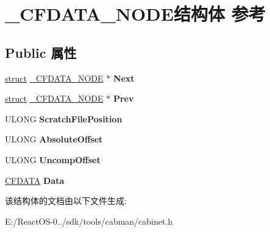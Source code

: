 \hypertarget{struct___c_f_d_a_t_a___n_o_d_e}{}\section{\+\_\+\+C\+F\+D\+A\+T\+A\+\_\+\+N\+O\+D\+E结构体 参考}
\label{struct___c_f_d_a_t_a___n_o_d_e}
\subsection*{Public 属性}
\begin{DoxyCompactItemize}
\item 
\mbox{\label{struct___c_f_d_a_t_a___n_o_d_e_a4a7a9c1c5ee08ed26302dc3ba5686542}} 
\hyperlink{interfacestruct}{struct} \hyperlink{struct___c_f_d_a_t_a___n_o_d_e}{\+\_\+\+C\+F\+D\+A\+T\+A\+\_\+\+N\+O\+DE} $\ast$ {\bfseries Next}
\item 
\mbox{\label{struct___c_f_d_a_t_a___n_o_d_e_a092d5560835be2e37dc0b11e6d3bfea1}} 
\hyperlink{interfacestruct}{struct} \hyperlink{struct___c_f_d_a_t_a___n_o_d_e}{\+\_\+\+C\+F\+D\+A\+T\+A\+\_\+\+N\+O\+DE} $\ast$ {\bfseries Prev}
\item 
\mbox{\label{struct___c_f_d_a_t_a___n_o_d_e_aec20aea2f5178a56855bcb5107ea31a3}} 
U\+L\+O\+NG {\bfseries Scratch\+File\+Position}
\item 
\mbox{\label{struct___c_f_d_a_t_a___n_o_d_e_a7e2057fb933826e0389485e581dc26b5}} 
U\+L\+O\+NG {\bfseries Absolute\+Offset}
\item 
\mbox{\label{struct___c_f_d_a_t_a___n_o_d_e_adcb837ca99f0bf84eba579bbd9d321d2}} 
U\+L\+O\+NG {\bfseries Uncomp\+Offset}
\item 
\mbox{\label{struct___c_f_d_a_t_a___n_o_d_e_af8c90f02bbc2b0539447d0547f9af117}} 
\hyperlink{struct_c_f_d_a_t_a}{C\+F\+D\+A\+TA} {\bfseries Data}
\end{DoxyCompactItemize}


该结构体的文档由以下文件生成\+:\begin{DoxyCompactItemize}
\item 
E\+:/\+React\+O\+S-\/0../sdk/tools/cabman/cabinet.\+h\end{DoxyCompactItemize}
